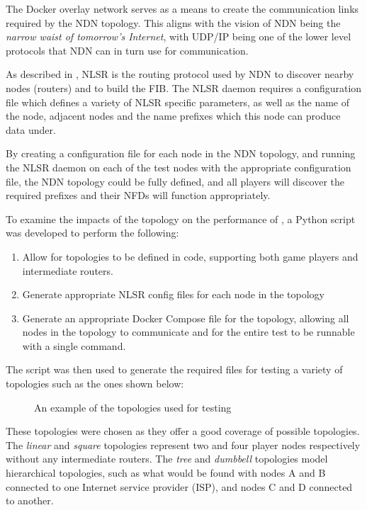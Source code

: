 The Docker overlay network serves as a means to create the communication links required by the NDN topology. This aligns with the vision of NDN being the \textit{narrow waist of tomorrow's Internet}, with UDP/IP being one of the lower level protocols that NDN can in turn use for communication.

As described in , NLSR is the routing protocol used by NDN to discover nearby nodes (routers) and to build the FIB. The NLSR daemon requires a configuration file which defines a variety of NLSR specific parameters, as well as the name of the node, adjacent nodes and the name prefixes which this node can produce data under. 

By creating a configuration file for each node in the NDN topology, and running the NLSR daemon on each of the test nodes with the appropriate configuration file, the NDN topology could be fully defined, and all players will discover the required prefixes and their NFDs will function appropriately.

To examine the impacts of the topology on the performance of \game{}, a Python script was developed to perform the following:

\begin{enumerate}
    \item Allow for topologies to be defined in code, supporting both game players and intermediate routers.
    \item Generate appropriate NLSR config files for each node in the topology
    \item Generate an appropriate Docker Compose file for the topology, allowing all nodes in the topology to communicate and for the entire test to be runnable with a single command.
\end{enumerate}

The script was then used to generate the required files for testing a variety of topologies such as the ones shown below:

\begin{figure}[H]
    \centering
    \caption{An example of the topologies used for testing \game{}}
    \label{fig:impl:topologies}
\end{figure}

These topologies were chosen as they offer a good coverage of possible topologies. The \textit{linear} and \textit{square} topologies represent two and four player nodes respectively without any intermediate routers. The \textit{tree} and \textit{dumbbell} topologies model hierarchical topologies, such as what would be found with nodes A and B connected to one Internet service provider (ISP), and nodes C and D connected to another.  

